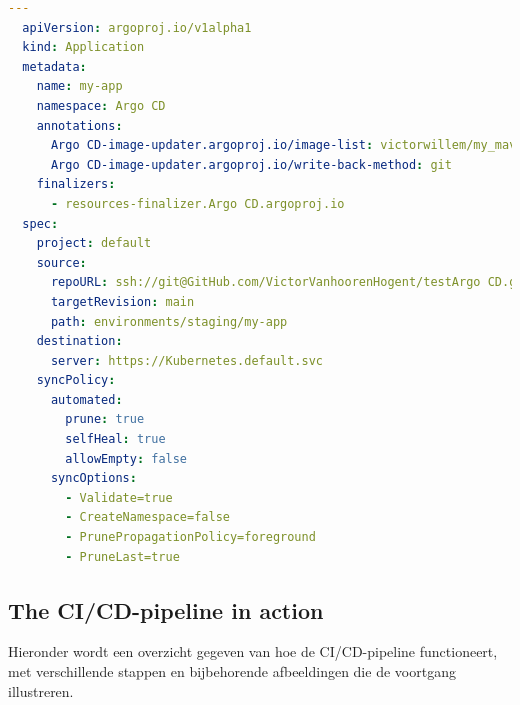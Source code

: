 \begin{lstlisting}[language=yaml, style=yamlstyle]
  ---
  apiVersion: argoproj.io/v1alpha1
  kind: Application
  metadata:
    name: my-app
    namespace: Argo CD
    annotations:
      Argo CD-image-updater.argoproj.io/image-list: victorwillem/my_maven_app:~v0.1
      Argo CD-image-updater.argoproj.io/write-back-method: git
    finalizers:
      - resources-finalizer.Argo CD.argoproj.io
  spec:
    project: default
    source:
      repoURL: ssh://git@GitHub.com/VictorVanhoorenHogent/testArgo CD.git
      targetRevision: main
      path: environments/staging/my-app
    destination:
      server: https://Kubernetes.default.svc
    syncPolicy:
      automated:
        prune: true
        selfHeal: true 
        allowEmpty: false
      syncOptions:
        - Validate=true
        - CreateNamespace=false
        - PrunePropagationPolicy=foreground
        - PruneLast=true
\end{lstlisting}


\subsection{
{The CI/CD-pipeline in action}}
\label{sec:De CI/CD-pipeline in werking}

Hieronder wordt een overzicht gegeven van hoe de CI/CD-pipeline functioneert, met verschillende stappen en bijbehorende afbeeldingen die de voortgang illustreren.

